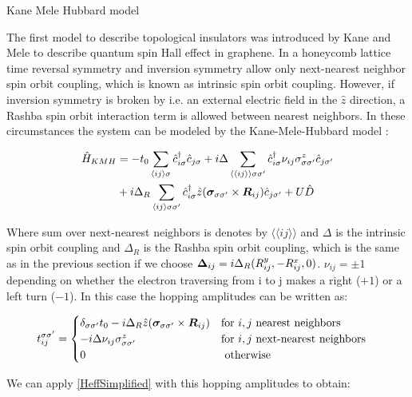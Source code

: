 \begin{section}{Kane Mele Hubbard model}

The first model to describe topological insulators was introduced by Kane and Mele \cite{Kane2005} to describe quantum spin Hall effect in graphene. In a honeycomb lattice time reversal symmetry and inversion symmetry allow only next-nearest neighbor spin orbit coupling, which is known as intrinsic spin orbit coupling. However, if inversion symmetry is broken by i.e. an external electric field in the $\hat{z}$ direction, a Rashba spin orbit interaction term is allowed between nearest neighbors. In these circumstances the system can be modeled by the Kane-Mele-Hubbard model \cite{Laubach2014}:

\begin{align}
\hat{H}_{KMH} &= -t_0\sum_{\langle i j \rangle \sigma} \hat{c}^{\dagger}_{i\sigma}\hat{c}_{j\sigma} + i\Delta \sum_{\langle \langle i j \rangle \rangle \sigma \sigma'} \hat{c}^{\dagger}_{i\sigma} \nu_{ij} \sigma^z_{\sigma \sigma'} \hat{c}_{j\sigma'} \nonumber \\
&+ i\Delta_R \sum_{\langle i j \rangle \sigma \sigma'} \hat{c}^{\dagger}_{i\sigma} \hat{z}(\boldsymbol{\sigma}_{\sigma \sigma'} \times \boldsymbol{R}_{ij}) \hat{c}_{j\sigma'} + U\hat{D}
\end{align}

Where sum over next-nearest neighbors is denotes by $\langle \langle i j \rangle \rangle$ and $\Delta$ is the intrinsic spin orbit coupling and $\Delta_R$ is the Rashba spin orbit coupling, which is the same as in the previous section if we choose $\boldsymbol{\Delta}_{ij} = i\Delta_R (R_{ij}^y, - R_{ij}^x, 0)$. $\nu_{ij}=\pm 1$ depending on whether the electron traversing from i to j makes a right ($+1$) or a left turn ($-1$). In this case the hopping amplitudes can be written as:

\begin{equation}
\label{HoppHubbSOI}
t_{ij}^{\sigma \sigma'} = \begin{cases}
	\delta_{\sigma \sigma'}t_0- i\Delta_R \hat{z}(\boldsymbol{\sigma}_{\sigma \sigma'} \times \boldsymbol{R}_{ij}) & \text{for } i, j \text{ nearest neighbors} \\
	-i\Delta \nu_{ij} \sigma_{\sigma \sigma'}^z & \text{for } i, j \text{ next-nearest neighbors} \\
	0 & \text{ otherwise}
\end{cases} \quad
\end{equation}

We can apply \ref{HeffSimplified} with this hopping amplitudes to obtain:


\end{section}
